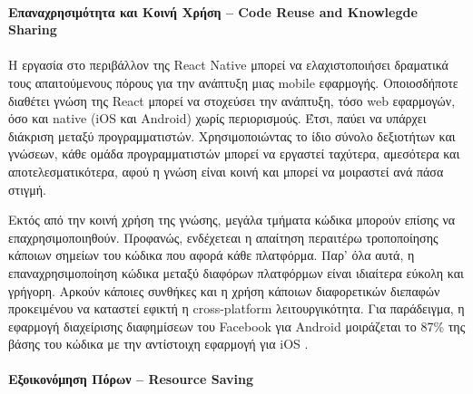 \paragraph{Επαναχρησιμότητα και Κοινή Χρήση \textbf{--} Code Reuse and Knowlegde Sharing} 
\paragraph{}

Η εργασία στο περιβάλλον της React Native μπορεί να ελαχιστοποιήσει δραματικά τους απαιτούμενους πόρους για την ανάπτυξη μιας mobile εφαρμογής. Οποιοσδήποτε διαθέτει γνώση της React μπορεί να στοχεύσει την ανάπτυξη, τόσο web εφαρμογών, όσο και native (iOS και Android) χωρίς περιορισμούς. Έτσι, παύει να υπάρχει διάκριση μεταξύ προγραμματιστών. Χρησιμοποιώντας το ίδιο σύνολο δεξιοτήτων και γνώσεων, κάθε ομάδα προγραμματιστών μπορεί να εργαστεί ταχύτερα, αμεσότερα και αποτελεσματικότερα, αφού η γνώση είναι κοινή και μπορεί να μοιραστεί ανά πάσα στιγμή.

Εκτός από την κοινή χρήση της γνώσης, μεγάλα τμήματα κώδικα μπορούν επίσης να επαχρησιμοποιηθούν. Προφανώς, ενδέχετεαι η απαίτηση περαιτέρω τροποποίησης κάποιων σημείων του κώδικα που αφορά κάθε πλατφόρμα. Παρ' όλα αυτά, η επαναχρησιμοποίηση κώδικα μεταξύ διαφόρων πλατφόρμων είναι ιδιαίτερα εύκολη και γρήγορη. Αρκούν κάποιες συνθήκες και η χρήση κάποιων διαφορετικών διεπαφών προκειμένου να καταστεί εφικτή η cross-platform λειτουργικότητα. Για παράδειγμα, η εφαρμογή διαχείρισης διαφημίσεων του Facebook για Android μοιράζεται το 87\% της βάσης του κώδικα με την αντίστοιχη εφαρμογή για iOS \cite{[RN1]}.

\paragraph{Εξοικονόμηση Πόρων \textbf{--} Resource Saving} 
\paragraph{}

